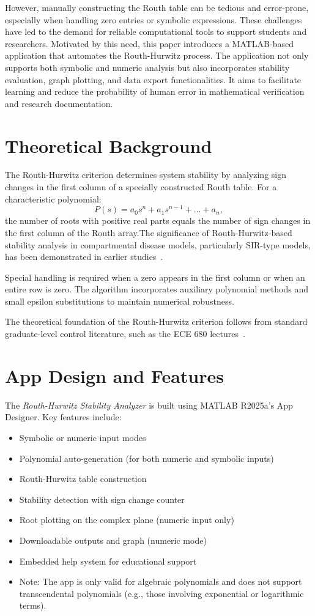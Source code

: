 \documentclass[11pt]{article}
\begin{document}
However, manually constructing the Routh table can be tedious and error-prone, especially when handling zero entries or symbolic expressions. These challenges have led to the demand for reliable computational tools to support students and researchers. Motivated by this need, this paper introduces a MATLAB-based application that automates the Routh-Hurwitz process. The application not only supports both symbolic and numeric analysis but also incorporates stability evaluation, graph plotting, and data export functionalities. It aims to facilitate learning and reduce the probability of human error in mathematical verification and research documentation.

\section{Theoretical Background}
The Routh-Hurwitz criterion determines system stability by analyzing sign changes in the first column of a specially constructed Routh table. For a characteristic polynomial:
\[ P(s) = a_0s^n + a_1s^{n-1} + \ldots + a_n, \]
the number of roots with positive real parts equals the number of sign changes in the first column of the Routh array.The significance of Routh-Hurwitz-based stability analysis in compartmental disease models, particularly SIR-type models, has been demonstrated in earlier studies~\cite{paper2}.

Special handling is required when a zero appears in the first column or when an entire row is zero. The algorithm incorporates auxiliary polynomial methods and small epsilon substitutions to maintain numerical robustness.

The theoretical foundation of the Routh-Hurwitz criterion follows from standard graduate-level control literature, such as the ECE 680 lectures~\cite{ece680}.

\section{App Design and Features}
The \emph{Routh-Hurwitz Stability Analyzer} is built using MATLAB R2025a's App Designer. Key features include:
\begin{itemize}
    \item Symbolic or numeric input modes
    \item Polynomial auto-generation (for both numeric and symbolic inputs)
    \item Routh-Hurwitz table construction
    \item Stability detection with sign change counter
    \item Root plotting on the complex plane (numeric input only)
    \item Downloadable outputs and graph (numeric mode)
    \item Embedded help system for educational support
    \item Note: The app is only valid for algebraic polynomials and does not support transcendental polynomials (e.g., those involving exponential or logarithmic terms).
\end{itemize}
\end{document}
